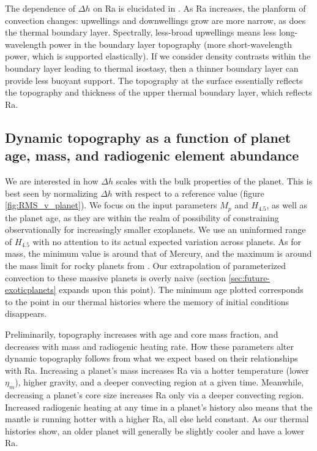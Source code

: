 The dependence of $\Delta h$ on Ra is elucidated in \citet{Kiefer1992}. As Ra increases, the planform of convection changes: upwellings and downwellings grow are more narrow, as does the thermal boundary layer. Spectrally, less-broad upwellings means less long-wavelength power in the boundary layer topography (more short-wavelength power, which is supported elastically). If we consider density contrasts within the boundary layer leading to thermal isostasy, then a thinner boundary layer can provide less buoyant support. The topography at the surface essentially reflects the topography and thickness of the upper thermal boundary layer, which reflects Ra. 


\subsection{Dynamic topography as a function of planet age, mass, and radiogenic element abundance}

We are interested in how $\Delta h$ scales with the bulk properties of the planet. This is best seen by normalizing $\Delta h$ with respect to a reference value (figure \ref{fig:RMS_v_planet}). We focus on the input parameters $M_p$ and $H_{4.5}$, as well as the planet age, as they are within the realm of possibility of constraining observationally for increasingly smaller exoplanets. We use an uninformed range of $H_{4.5}$ with no attention to its actual expected variation across planets. As for mass, the minimum value is around that of Mercury, and the maximum is around the mass limit for rocky planets from \citet{Rogers2015}. Our extrapolation of parameterized convection to these massive planets is overly naive (section \ref{sec:future-exoticplanets} expands upon this point). The minimum age plotted corresponds to the point in our thermal histories where the memory of initial conditions disappears.

Preliminarily, topography increases with age and core mass fraction, and decreases with mass and radiogenic heating rate. How these parameters alter dynamic topography follows from what we expect based on their relationships with Ra. Increasing a planet's mass increases Ra via a hotter temperature (lower $\eta_m$), higher gravity, and a deeper convecting region at a given time. Meanwhile, decreasing a planet's core size increases Ra only via a deeper convecting region. Increased radiogenic heating at any time in a planet's history also means that the mantle is running hotter with a higher Ra, all else held constant. As our thermal histories show, an older planet will generally be slightly cooler and have a lower Ra.
 




